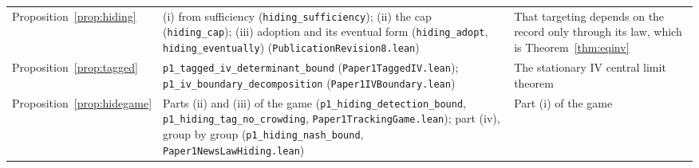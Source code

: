 \documentclass[12pt]{article}
\theoremstyle{definition}
\theoremstyle{remark}
\begin{document}
\begin{longtable}{>{\raggedright\arraybackslash}p{}>{\raggedright\arraybackslash}p{}>{\raggedright\arraybackslash}p{}}
Proposition~\ref{prop:hiding} & (i) from sufficiency (\texttt{hiding\_sufficiency}); (ii) the cap (\texttt{hiding\_cap}); (iii) adoption and its eventual form (\texttt{hiding\_adopt}, \texttt{hiding\_eventually}) (\nolinkurl{PublicationRevision8.lean}) & That targeting depends on the record only through its law, which is Theorem~\ref{thm:eqinv}\\
Proposition~\ref{prop:tagged} & \texttt{p1\_tagged\_iv\_determinant\_bound} (\nolinkurl{Paper1TaggedIV.lean}); \texttt{p1\_iv\_boundary\_decomposition} (\nolinkurl{Paper1IVBoundary.lean}) & The stationary IV central limit theorem\\
Proposition~\ref{prop:hidegame} & Parts (ii) and (iii) of the game (\texttt{p1\_hiding\_detection\_bound}, \texttt{p1\_hiding\_tag\_no\_crowding}, \nolinkurl{Paper1TrackingGame.lean}); part (iv), group by group (\texttt{p1\_hiding\_nash\_bound}, \nolinkurl{Paper1NewsLawHiding.lean}) & Part (i) of the game\\


\end{longtable}
\end{document}
